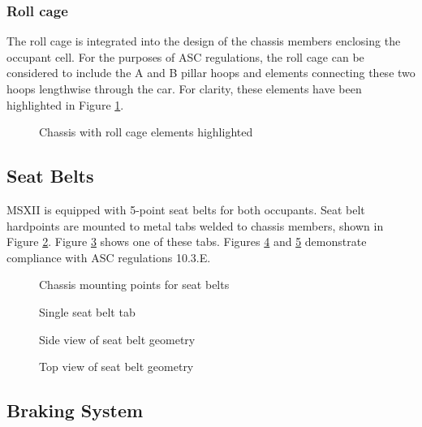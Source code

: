 \documentclass[10pt]{article}
\begin{document}
\subsubsection{Roll cage}
The roll cage is integrated into the design of the chassis members enclosing the occupant cell. For the purposes of ASC regulations, the roll cage can be considered to include the A and B pillar hoops and elements connecting these two hoops lengthwise through the car. For clarity, these elements have been highlighted in Figure \ref{fig:roll-cage}.

\begin{figure}
\centering
\caption{Chassis with roll cage elements highlighted}
\label{fig:roll-cage}
\end{figure}


\subsection{Seat Belts}
MSXII is equipped with 5-point seat belts for both occupants. Seat belt hardpoints are mounted to metal tabs welded to chassis members, shown in Figure \ref{fig:seat-belt-tab-positions}. Figure \ref{fig:seat-belt-tab} shows one of these tabs. Figures \ref{fig:seat-belt-side-view} and \ref{fig:seat-belt-top-view} demonstrate compliance with ASC regulations 10.3.E.

\begin{figure}
\centering
\caption{Chassis mounting points for seat belts}
\label{fig:seat-belt-tab-positions}
\end{figure}

\begin{figure}
\centering
\caption{Single seat belt tab}
\label{fig:seat-belt-tab}
\end{figure}

\begin{figure}
\centering
\caption{Side view of seat belt geometry}
\label{fig:seat-belt-side-view}
\end{figure}

\begin{figure}
\centering
\caption{Top view of seat belt geometry}
\label{fig:seat-belt-top-view}
\end{figure}

\subsection{Braking System}
\end{document}
